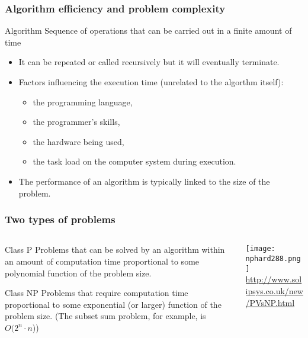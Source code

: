 \documentclass[c]{beamer}
\begin{document}
\begin{frame}
  \frametitle{Algorithm efficiency and problem complexity}
  \begin{block}{Algorithm}
    Sequence of operations that can be carried out in a finite amount of time
  \end{block}
  \begin{itemize}
    \item It can be repeated or called recursively but it will eventually terminate.
    \item Factors influencing the execution time (unrelated to the algorthm itself):
    \begin{itemize}
      \item the programming language,
      \item the programmer's skills,
      \item the hardware being used,
      \item the task load on the computer system during execution.
    \end{itemize}
    \item The performance of an algorithm is typically linked to the size of the problem.
  \end{itemize}
\end{frame}

\begin{frame}
  \frametitle{Two types of problems}
  \begin{columns}
    \begin{column}{0.5\textwidth}
      \begin{block}{Class P}
        Problems that can be solved by an algorithm within an amount of computation time proportional to some polynomial function of the problem size.
      \end{block}
      \begin{block}{Class NP}
        Problems that require computation time proportional to some exponential (or larger) function of the problem size. (The subset sum problem, for example, is $O(2^n\cdot n$))
      \end{block}
    \end{column}
    \begin{column}{0.5\textwidth}
      \begin{center}
        \texttt{[image: nphard288.png]}\\
        \footnotesize{\url{http://www.solipsys.co.uk/new/PVsNP.html}}
      \end{center}
    \end{column}
  \end{columns}
\end{frame}
\end{document}
